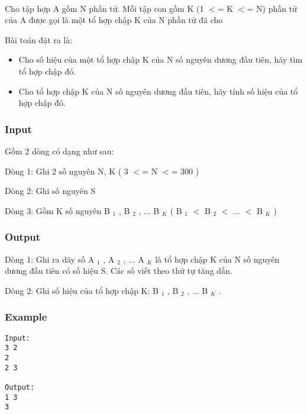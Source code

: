 

 

Cho tập hợp A gồm N phần tử. Mỗi tập con gồm K (1 $<$= K $<$= N) phần tử của A được gọi là một tổ hợp chập K của N phần tử đã cho

Bài toán đặt ra là:
\begin{itemize}
	\item Cho số hiệu của một tổ hợp chập K của N số nguyên dương đầu tiên, hãy tìm tổ hợp chập đó.
	\item Cho tổ hợp chập K của N số nguyên dương đầu tiên, hãy tính số hiệu của tổ hợp chập đó.
\end{itemize}

\subsubsection{Input}

Gồm 2 dòng có dạng như sau:

Dòng 1: Ghi 2 số nguyên N, K ( 3 $<$= N $<$= 300 )

Dòng 2: Ghi số nguyên S

Dòng 3: Gồm K số nguyên B $_ 1 $ , B $_ 2 $ , ... B $_ K $ ( B $_ 1 $ $<$ B $_ 2 $ $<$ ... $<$ B $_ K $ )

\subsubsection{Output}

Dòng 1: Ghi ra dãy số A $_ 1 $ , A $_ 2 $ , ... A $_ K $ là tổ hợp chập K của N số nguyên dương đầu tiên có số hiệu S. Các số viết theo thứ tự tăng dần.

Dòng 2: Ghi số hiệu của tổ hợp chập K: B $_ 1 $ , B $_ 2 $ , ... B $_ K $ .

\subsubsection{Example}
\begin{verbatim}
Input:
3 2 
2
2 3

Output:
1 3
3

\end{verbatim}